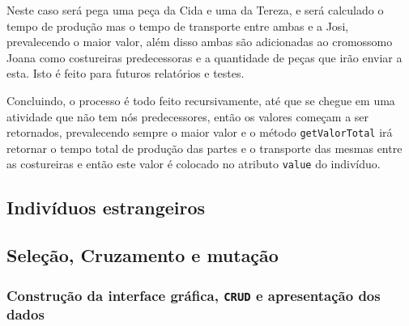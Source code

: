 \newpage

\par Neste caso será pega uma peça da Cida e uma da Tereza, e será calculado o tempo de produção mas o tempo de transporte entre ambas
e a Josi, prevalecendo o maior valor, além disso ambas são adicionadas ao cromossomo Joana como costureiras predecessoras e a quantidade
de peças que irão enviar a esta. Isto é feito para futuros relatórios e testes.

\par Concluindo, o processo é todo feito recursivamente, até que se chegue em uma atividade que não tem nós predecessores, então os valores começam a ser retornados, prevalecendo sempre o maior valor e o método \texttt{getValorTotal} irá retornar o tempo total de 
produção das partes e o transporte das mesmas entre as costureiras e então este valor é colocado no atributo \texttt{value} do 
indivíduo.


\subsection{Indivíduos estrangeiros}
  
  
\subsection{Seleção, Cruzamento e mutação}
 
 
\subsubsection{Construção da interface gráfica, \texttt{CRUD} e apresentação dos dados}




